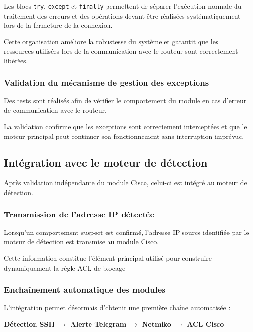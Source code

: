 Les blocs \texttt{try}, \texttt{except} et \texttt{finally} permettent de séparer l'exécution normale du traitement des erreurs et des opérations devant être réalisées systématiquement lors de la fermeture de la connexion.

Cette organisation améliore la robustesse du système et garantit que les ressources utilisées lors de la communication avec le routeur sont correctement libérées.

\subsubsection{Validation du mécanisme de gestion des exceptions}

Des tests sont réalisés afin de vérifier le comportement du module en cas d'erreur de communication avec le routeur.

La validation confirme que les exceptions sont correctement interceptées et que le moteur principal peut continuer son fonctionnement sans interruption imprévue.

\subsection{Intégration avec le moteur de détection}

Après validation indépendante du module Cisco, celui-ci est intégré au moteur de détection.

\subsubsection{Transmission de l'adresse IP détectée}

Lorsqu'un comportement suspect est confirmé, l'adresse IP source identifiée par le moteur de détection est transmise au module Cisco.

Cette information constitue l'élément principal utilisé pour construire dynamiquement la règle ACL de blocage.

\subsubsection{Enchaînement automatique des modules}

L'intégration permet désormais d'obtenir une première chaîne automatisée :

\begin{center}
\textbf{Détection SSH $\rightarrow$ Alerte Telegram $\rightarrow$ Netmiko $\rightarrow$ ACL Cisco}
\end{center}

